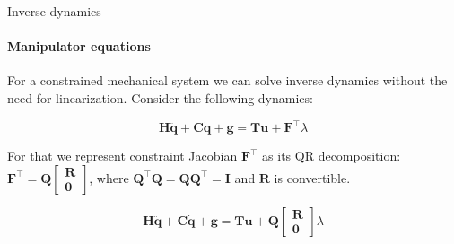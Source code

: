 \documentclass{beamer}
\begin{document}
\begin{frame}{Inverse dynamics}
\framesubtitle{Manipulator equations}
\begin{flushleft}

For a constrained mechanical system we can solve inverse dynamics without the need for linearization. Consider the following dynamics:

\begin{equation}
    \mathbf{H}\ddot{\mathbf{q}} + \mathbf{C}\dot{\mathbf{q}} + \mathbf{g} = \mathbf{T}\mathbf{u} + \mathbf{F}^\top \lambda
\end{equation}

For that we represent constraint Jacobian $\mathbf{F}^\top$ as its QR decomposition: $\mathbf{F}^\top = \mathbf{Q} \begin{bmatrix} \mathbf{R} \\ \mathbf{0}  \end{bmatrix}$, where $\mathbf{Q}^\top \mathbf{Q} = \mathbf{Q} \mathbf{Q}^\top = \mathbf{I}$ and $\mathbf{R}$ is convertible.

\begin{equation}
    \mathbf{H}\ddot{\mathbf{q}} + \mathbf{C}\dot{\mathbf{q}} + \mathbf{g} = \mathbf{T}\mathbf{u} + \mathbf{Q} \begin{bmatrix} \mathbf{R} \\ \mathbf{0}  \end{bmatrix} \lambda
\end{equation}


\end{flushleft}
\end{frame}
\end{document}
